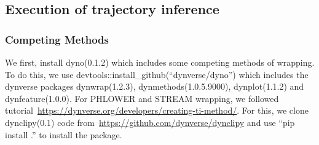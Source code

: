 


\subsection{Execution of trajectory inference}
\subsubsection{Competing Methods}
	We first, install dyno(0.1.2) which includes some competing methods of wrapping. To do this, we use devtools::install\_github(``dynverse/dyno'') which includes the dynverse packages dynwrap(1.2.3),  dynmethods(1.0.5.9000), dynplot(1.1.2) and dynfeature(1.0.0). For PHLOWER and STREAM wrapping, we followed tutorial~\url{https://dynverse.org/developers/creating-ti-method/}. For this, we clone dynclipy(0.1) code from~\url{https://github.com/dynverse/dynclipy} and use ``pip install .'' to install the package.
